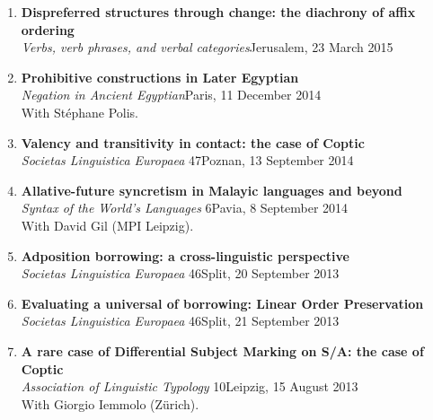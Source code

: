 \documentclass[letterpaper,11pt]{article}
\begin{document}
\begin{enumerate}
\item \textbf{Dispreferred structures through change: the diachrony of affix ordering}\\\textit{Verbs, verb phrases, and verbal categories}\hfill{Jerusalem, 23 March 2015}


\item \textbf{Prohibitive constructions in Later Egyptian}\\
\textit{Negation in Ancient Egyptian}\hfill{Paris, 11 December 2014}\\With St\'ephane Polis.

\item \textbf{Valency and transitivity in contact: the case of Coptic}\\\textit{Societas Linguistica Europaea} 47\hfill{Poznan, 13 September 2014} 

\item \textbf{Allative-future syncretism in Malayic languages and beyond}\\\textit{Syntax of the World’s Languages} 6\hfill{Pavia, 8 September 2014}\\With David Gil (MPI Leipzig).  

\item \textbf{Adposition borrowing: a cross-linguistic perspective}\\
\textit{Societas Linguistica Europaea} 46\hfill{Split, 20 September 2013} 

\item \textbf{Evaluating a universal of borrowing: Linear Order Preservation}\\ \textit{Societas Linguistica Europaea} 46\hfill{Split, 21 September 2013} 

\item \textbf{A rare case of Differential Subject Marking on S/A: the case of Coptic}\\\textit{Association of Linguistic Typology} 10\hfill{Leipzig, 15 August 2013}\\ With Giorgio Iemmolo (Z\"urich). 


\end{enumerate}
\end{document}
